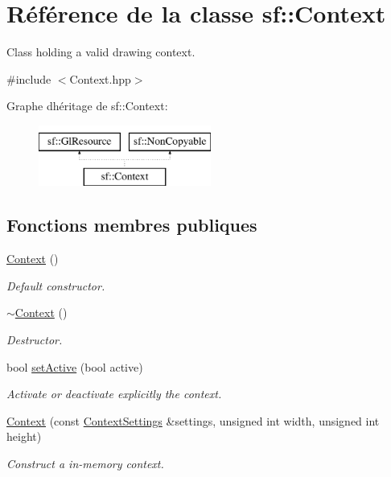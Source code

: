\hypertarget{classsf_1_1Context}{}\section{Référence de la classe sf\+:\+:Context}
\label{classsf_1_1Context}


Class holding a valid drawing context.  




{\ttfamily \#include $<$Context.\+hpp$>$}

Graphe d\textquotesingle{}héritage de sf\+:\+:Context\+:\begin{figure}[H]
\begin{center}
\leavevmode
\includegraphics[height=2.000000cm]{classsf_1_1Context}
\end{center}
\end{figure}
\subsection*{Fonctions membres publiques}
\begin{DoxyCompactItemize}
\item 
\hyperlink{classsf_1_1Context_aba22797a790706ca2c5c04ee39f2b555}{Context} ()
\begin{DoxyCompactList}\small\item\em Default constructor. \end{DoxyCompactList}\item 
\hyperlink{classsf_1_1Context_a805b1bbdb3e52b1fda7c9bf2cd6ca86b}{$\sim$\+Context} ()
\begin{DoxyCompactList}\small\item\em Destructor. \end{DoxyCompactList}\item 
bool \hyperlink{classsf_1_1Context_a0806f915ea81ae1f4e8135a7a3696562}{set\+Active} (bool active)
\begin{DoxyCompactList}\small\item\em Activate or deactivate explicitly the context. \end{DoxyCompactList}\item 
\hyperlink{classsf_1_1Context_a2a9e3529e48919120e6b6fc10bad296c}{Context} (const \hyperlink{structsf_1_1ContextSettings}{Context\+Settings} \&settings, unsigned int width, unsigned int height)
\begin{DoxyCompactList}\small\item\em Construct a in-\/memory context. \end{DoxyCompactList}\end{DoxyCompactItemize}
